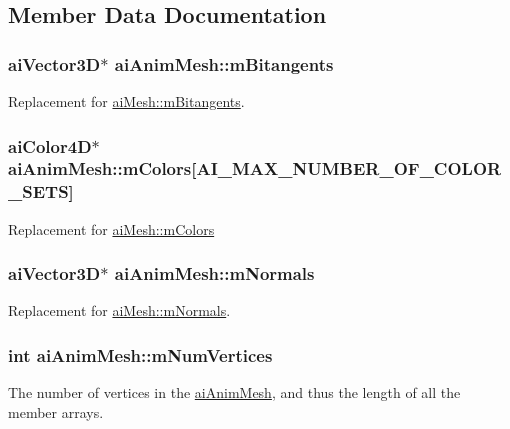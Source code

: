 \subsection{Member Data Documentation}
\hypertarget{structai_anim_mesh_a7d60acf4d2b4b59dcc6c88956bfae85f}{
\subsubsection[{m\-Bitangents}]{ {\bf ai\-Vector3\-D}$\ast$ ai\-Anim\-Mesh\-::m\-Bitangents}}\label{structai_anim_mesh_a7d60acf4d2b4b59dcc6c88956bfae85f}
Replacement for \hyperlink{structai_mesh_ab2a81bfe1731f01271ebab274a8f01c4}{ai\-Mesh\-::m\-Bitangents}. \hypertarget{structai_anim_mesh_a4f062d9fac71c6b367fdf0f8638e1ca5}{
\subsubsection[{m\-Colors}]{ {\bf ai\-Color4\-D}$\ast$ ai\-Anim\-Mesh\-::m\-Colors\mbox{[}{\bf A\-I\-\_\-\-M\-A\-X\-\_\-\-N\-U\-M\-B\-E\-R\-\_\-\-O\-F\-\_\-\-C\-O\-L\-O\-R\-\_\-\-S\-E\-T\-S}\mbox{]}}}\label{structai_anim_mesh_a4f062d9fac71c6b367fdf0f8638e1ca5}
Replacement for \hyperlink{structai_mesh_ad9215f67bd0c2277b10775a8adb66b96}{ai\-Mesh\-::m\-Colors} \hypertarget{structai_anim_mesh_a64a07a8c5c419b1e006c5302bca4d334}{
\subsubsection[{m\-Normals}]{ {\bf ai\-Vector3\-D}$\ast$ ai\-Anim\-Mesh\-::m\-Normals}}\label{structai_anim_mesh_a64a07a8c5c419b1e006c5302bca4d334}
Replacement for \hyperlink{structai_mesh_aec81b496b4d93838cef038933dabe9b9}{ai\-Mesh\-::m\-Normals}. \hypertarget{structai_anim_mesh_a6bb0d45317a1bbea7f2b7f8191d0c436}{
\subsubsection[{m\-Num\-Vertices}]{ {\bf int} ai\-Anim\-Mesh\-::m\-Num\-Vertices}}\label{structai_anim_mesh_a6bb0d45317a1bbea7f2b7f8191d0c436}
The number of vertices in the \hyperlink{structai_anim_mesh}{ai\-Anim\-Mesh}, and thus the length of all the member arrays.

